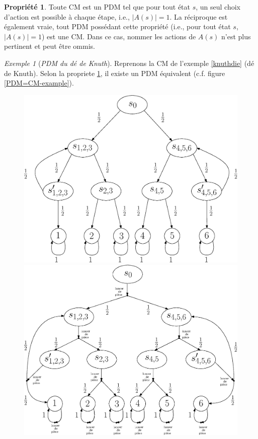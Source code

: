 \documentclass[12pt,a4paper]{report}
\theoremstyle{definition}%
\newtheorem{propriete}{Propriété}[chapter]
\theoremstyle{remark}
\newtheorem{example}{Exemple}[chapter]
\begin{document}
\begin{propriete} \label{PDM=CM}
	Toute CM est un PDM tel que pour tout état $s$, un seul choix d'action est
	possible à chaque étape, i.e., $|A(s)| = 1$. La réciproque est également vraie, tout
	PDM possédant cette propriété (i.e., pour tout état $s$, $|A(s)| = 1$) est une
	CM. Dans ce cas, nommer les actions de $A(s)$ n'est plus pertinent et peut être
	ommis.
\end{propriete}

\begin{example}[\textit{PDM du dé de Knuth}]
Reprenons la CM de l'exemple \ref{knuthdie} (dé de Knuth). Selon la propriete \ref{PDM=CM},
il existe un PDM équivalent (c.f. figure \ref{PDM=CM-example}).
	\begin{figure}[H]
		\captionsetup{justification=centering}
		\begin{minipage}{0.45\textwidth}
				\centering
				\includegraphics[scale=0.4]{figures/dieByaCoin.eps}
		\end{minipage}
		\hspace{0.05\textwidth}
		\begin{minipage}{0.45\textwidth}
				\centering
				\includegraphics[scale=0.4]{figures/dieByaCoinPDM}

\end{minipage}
\end{figure}
\end{example}
\end{document}

